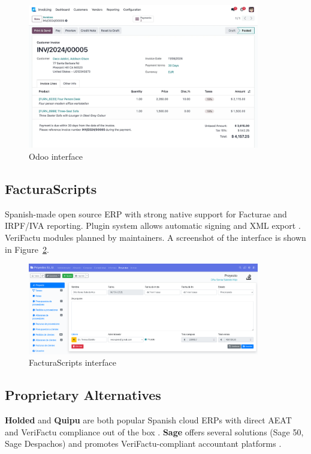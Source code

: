 \begin{figure}[H]
  \centering
  \includegraphics[width=0.9\textwidth]{imaxes/odoo-ui.png}
  \caption{Odoo interface}
  \label{fig:odoo-ui}
\end{figure}

\subsection{FacturaScripts}
Spanish-made open source ERP with strong native support for Facturae and IRPF/IVA reporting. Plugin system allows automatic signing and XML export \cite{FacturaScriptsAntifraude}. VeriFactu modules planned by maintainers. A screenshot of the interface is shown in Figure~\ref{fig:facturascripts-ui}.

\begin{figure}[H]
  \centering
  \includegraphics[width=0.9\textwidth]{imaxes/facturascripts-ui.png}
  \caption{FacturaScripts interface}
  \label{fig:facturascripts-ui}
\end{figure}

\subsection{Proprietary Alternatives}

\textbf{Holded} and \textbf{Quipu} are both popular Spanish cloud ERPs with direct AEAT and VeriFactu compliance out of the box \cite{HoldedVerifactu, QuipuVerifactu}. \textbf{Sage} offers several solutions (Sage 50, Sage Despachos) and promotes VeriFactu-compliant accountant platforms \cite{SageVerifactu, SageBlogAsesoria}.

